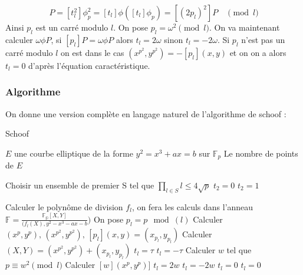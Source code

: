 \documentclass{article}
\begin{document}
\begin{equation}
[t_l^2 p_l]P = [t_l^2] \phi_p^2 = [t_l] \phi ([t_l] \phi_p) = [(2p_l)^2]P \quad \pmod{l}
\end{equation}
Ainsi $p_l$ est un carré modulo $l$. On pose $p_l = \omega^2 \pmod{l}$. On va maintenant calculer $\omega \phi P$, si $[p_l]P = \omega \phi P$ alors $t_l = 2\omega$ sinon $t_l = -2\omega$.
\newline
\medskip
Si $p_l$ n'est pas un carré modulo $l$ on est dans le cas $(x^{p^2}, y^{p^2}) = - [p_l](x,y)$ et on on a alors $t_l = 0$ d'après l'équation caractéristique. 

\newpage
\subsubsection{Algorithme}
On donne une version complète en langage naturel de l'algorithme de schoof : 

\begin{algorithm}
\caption{Schoof}
\begin{algorithmic}
\REQUIRE $E$ une courbe elliptique de la forme $y^2 = x^3 + ax = b$ sur $\mathbb{F}_p$
\ENSURE Le nombre de points de $E$

\STATE Choisir un ensemble de premier S tel que $\prod_{l \in S}l \leq 4\sqrt{p}$
\STATE $t_2 = 0$
\ELSE
\STATE $t_2 = 1$
\ENDIF

\STATE Calculer le polynôme de division $f_l$, on fera les calculs dans l'anneau $\mathbb{F}= \frac{\mathbb{F_p}[X,Y]}{(f_l(X), y^2 -x^3 - ax - b})$
\STATE On pose $p_l = p \mod(l)$
\STATE Calculer $(x^p, y^p), \, (x^{p^2}, y^{p^2}), \, [p_l](x, y) = (x_{p_l}, y_{p_l})$
\STATE Calculer $(X, Y) = (x^{p^2}, y^{p^2}) + (x_{p_l}, y_{p_l})$
\STATE $t_l = \tau$
\ELSE 
\STATE $t_l = - \tau$
\ENDIF
\ENDIF
\ENDFOR
\ELSE
{}
\STATE Calculer $w$ tel que $p \equiv w^2 \pmod l$ 
\STATE Calculer $[w](x^p,y^p)]$
\IF{$[w](x^p,y^p)] = (x^{p^2}, y^{p^2})$}
\STATE $t_l = 2w$
\ENDIF
\IF{$[w](x^p,y^p)] = (x^{p^2}, -y^{p^2})$}
\STATE $t_l = -2w$
\ELSE
\STATE $t_l =0$
\ENDIF
\ELSE
\STATE $t_l = 0$

\ENDIF
\ENDIF
\ENDFOR
\end{algorithmic}
\end{algorithm}
\end{document}
